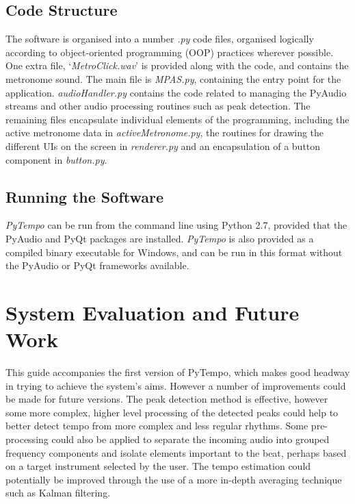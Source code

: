 \documentclass[hidelinks,12pt]{article}
\begin{document}
\subsection{Code Structure}
The software is organised into a number \textit{.py} code files, organised logically according to object-oriented programming (OOP) practices wherever possible. One extra file, `\textit{MetroClick.wav}' is provided along with the code, and contains the metronome sound. The main file is \textit{MPAS.py}, containing the entry point for the application. \textit{audioHandler.py} contains the code related to managing the PyAudio streams and other audio processing routines such as peak detection. The remaining files encapsulate individual elements of the programming, including the active metronome data in \textit{activeMetronome.py}, the routines for drawing the different UIs on the screen in \textit{renderer.py} and an encapsulation of a button component in \textit{button.py}.

\subsection{Running the Software}
\textit{PyTempo} can be run from the command line using Python 2.7, provided that the PyAudio and PyQt packages are installed. \textit{PyTempo} is also provided as a compiled binary executable for Windows, and can be run in this format without the PyAudio or PyQt frameworks available.

\section{System Evaluation and Future Work}
This guide accompanies the first version of PyTempo, which makes good headway in trying to achieve the system's aims. However a number of improvements could be made for future versions. The peak detection method is effective, however some more complex, higher level processing of the detected peaks could help to better detect tempo from more complex and less regular rhythms. Some pre-processing could also be applied to separate the incoming audio into grouped frequency components and isolate elements important to the beat, perhaps based on a target instrument selected by the user. The tempo estimation could potentially be improved through the use of a more in-depth averaging technique such as Kalman filtering.
\end{document}
